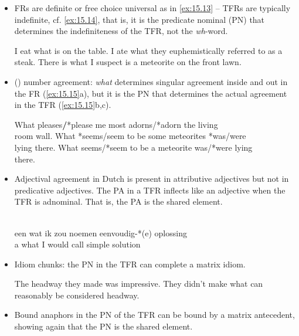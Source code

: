 \documentclass[output=paper]{langsci/langscibook}
\begin{document}
\begin{refcontext}
\begin{itemize}

    \item 	 \glspl{FR} are definite or free choice universal as in \eqref{ex:15.13} –
        \glspl{TFR} are typically indefinite, cf. \eqref{ex:15.14}, that is, it is the
        predicate nominal (PN) that determines the indefiniteness of the
        \gls{TFR}, not the \emph{wh}{}-word.

\ea\label{ex:15.13}
    I eat what is on the table.
\z
\ea\label{ex:15.14}
    \ea I ate what they euphemistically referred to as a steak.
    \ex There is what I suspect is a meteorite on the front lawn.
    \z
\z

    \item 	 () number agreement: \emph{what} determines singular
        agreement inside and out in the \gls{FR} (\ref{ex:15.15}a), but it is the \gls{PN}
        that determines the actual agreement in the \gls{TFR} (\ref{ex:15.15}b,c).

\ea\label{ex:15.15}
    \ea What pleases\textbf{/}*please me most adorns/*adorn the living\\ room wall.
    \ex What *seems/seem to be some meteorites *was/were \\ lying there.
    \ex What seems/*seem to be a meteorite was/*were lying\\ there.
    \z
\z

    \item Adjectival agreement in Dutch is present in attributive adjectives
        but not in predicative adjectives. The \gls{PA} in a
        \gls{TFR} inflects like an adjective when the \gls{TFR} is adnominal.
        That is, the \gls{PA} is the shared element.


\ea\label{ex:15.16}\\
    \gll    een  wat    ik zou     noemen eenvoudig-*(e) oplossing  \\
            a      what  I  would call        simple               solution\\
    \glt
\z

    \item Idiom chunks: the \gls{PN} in the \gls{TFR} can complete a matrix
        idiom.

\ea\label{ex:15.17}
    \ea The headway they made was impressive.
    \ex They didn't make what can reasonably be considered headway.
    \z
\z

    \item Bound anaphors in the \gls{PN} of the \gls{TFR} can be bound by a matrix
antecedent, showing again that the \gls{PN} is the shared element.


\end{itemize}
\end{refcontext}
\end{document}
